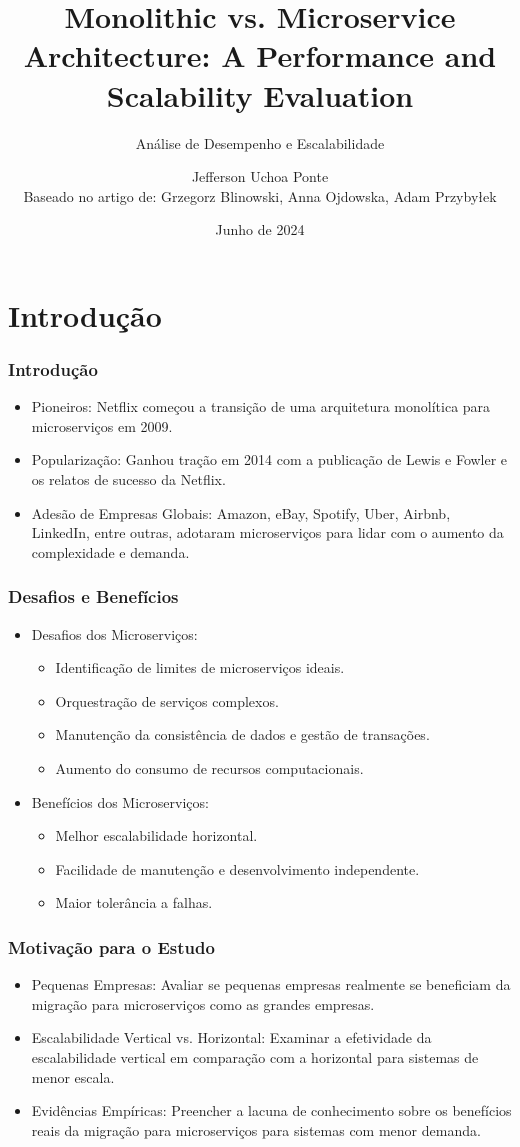 \documentclass{beamer}
\title[Monolithic vs. Microservices] %
{Monolithic vs. Microservice Architecture: A Performance and Scalability Evaluation}
\subtitle{Análise de Desempenho e Escalabilidade}
\author[Jefferson Uchoa Ponte] %
{Jefferson Uchoa Ponte\\
Baseado no artigo de: Grzegorz Blinowski, Anna Ojdowska, Adam Przybyłek}
\institute[UECE] %
{
  Universidade Estadual do Ceará (UECE) \\
  Engenharia de Software \\
  Prof. Matheus Paixão
}
\date[Junho 2024] %
{Junho de 2024}
\begin{document}
\frame{\titlepage}

\section{Introdução}

\begin{frame}
\frametitle{Introdução}
\begin{itemize}
    \item Pioneiros: Netflix começou a transição de uma arquitetura monolítica para microserviços em 2009.
    \item Popularização: Ganhou tração em 2014 com a publicação de Lewis e Fowler e os relatos de sucesso da Netflix.
    \item Adesão de Empresas Globais: Amazon, eBay, Spotify, Uber, Airbnb, LinkedIn, entre outras, adotaram microserviços para lidar com o aumento da complexidade e demanda.
\end{itemize}
\end{frame}

\begin{frame}
\frametitle{Desafios e Benefícios}
\begin{itemize}
    \item Desafios dos Microserviços:
    \begin{itemize}
        \item Identificação de limites de microserviços ideais.
        \item Orquestração de serviços complexos.
        \item Manutenção da consistência de dados e gestão de transações.
        \item Aumento do consumo de recursos computacionais.
    \end{itemize}
    \item Benefícios dos Microserviços:
    \begin{itemize}
        \item Melhor escalabilidade horizontal.
        \item Facilidade de manutenção e desenvolvimento independente.
        \item Maior tolerância a falhas.
    \end{itemize}
\end{itemize}
\end{frame}

\begin{frame}
\frametitle{Motivação para o Estudo}
\begin{itemize}
    \item Pequenas Empresas: Avaliar se pequenas empresas realmente se beneficiam da migração para microserviços como as grandes empresas.
    \item Escalabilidade Vertical vs. Horizontal: Examinar a efetividade da escalabilidade vertical em comparação com a horizontal para sistemas de menor escala.
    \item Evidências Empíricas: Preencher a lacuna de conhecimento sobre os benefícios reais da migração para microserviços para sistemas com menor demanda.
\end{itemize}
\end{frame}
\end{document}

